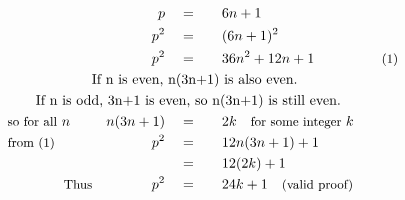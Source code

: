 \begin{alignat*}{5}
&\,&p\quad&=\quad&&6n+1\\
&\,&p^2\quad&=&&(6n+1)^2\\
&\,&p^2\quad&=&&36n^2+12n+1&&\quad\small\text{(1)}\\
&\qquad\qquad\qquad\rlap{\text{If }n\text{ is even, }n(3n+1)\text{ is also even.}}\\
&\qquad\rlap{\text{If }n\text{ is odd, }3n+1\text{ is even, so }n(3n+1)\text{ is still even.}}\\
&\small\text{so for all}\normalsize~n\quad&n(3n+1)\quad&=&&2k\quad\small\text{for some integer }\normalsize k\\
&\small\text{from (1)}&p^2\quad&=&&12n(3n+1)+1\\
&\,&\,&=&&12(2k)+1\\
&\qquad\qquad\small\text{Thus}&p^2\quad&=&&24k+1\quad\small\text{(valid proof)}
\end{alignat*}
